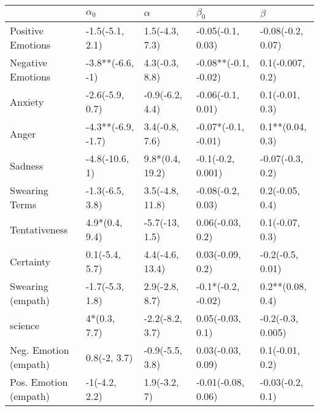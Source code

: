 \begin{tabular}{lllll}
\toprule
{} &          $\alpha_0$ &         $\alpha$ &             $\beta_0$ &            $\beta$ \\
\midrule
Positive Emotions     &     -1.5(-5.1, 2.1) &   1.5(-4.3, 7.3) &     -0.05(-0.1, 0.03) &  -0.08(-0.2, 0.07) \\
Negative Emotions     &    -3.8**(-6.6, -1) &   4.3(-0.3, 8.8) &  -0.08**(-0.1, -0.02) &   0.1(-0.007, 0.2) \\
Anxiety               &     -2.6(-5.9, 0.7) &  -0.9(-6.2, 4.4) &     -0.06(-0.1, 0.01) &    0.1(-0.01, 0.3) \\
Anger                 &  -4.3**(-6.9, -1.7) &   3.4(-0.8, 7.6) &   -0.07*(-0.1, -0.01) &   0.1**(0.04, 0.3) \\
Sadness               &      -4.8(-10.6, 1) &  9.8*(0.4, 19.2) &     -0.1(-0.2, 0.001) &   -0.07(-0.3, 0.2) \\
Swearing Terms        &     -1.3(-6.5, 3.8) &  3.5(-4.8, 11.8) &     -0.08(-0.2, 0.03) &    0.2(-0.05, 0.4) \\
Tentativeness         &      4.9*(0.4, 9.4) &   -5.7(-13, 1.5) &      0.06(-0.03, 0.2) &    0.1(-0.07, 0.3) \\
Certainty             &      0.1(-5.4, 5.7) &  4.4(-4.6, 13.4) &      0.03(-0.09, 0.2) &   -0.2(-0.5, 0.01) \\
Swearing (empath)     &     -1.7(-5.3, 1.8) &   2.9(-2.8, 8.7) &    -0.1*(-0.2, -0.02) &   0.2**(0.08, 0.4) \\
science               &        4*(0.3, 7.7) &  -2.2(-8.2, 3.7) &      0.05(-0.03, 0.1) &  -0.2(-0.3, 0.005) \\
Neg. Emotion (empath) &        0.8(-2, 3.7) &  -0.9(-5.5, 3.8) &     0.03(-0.03, 0.09) &    0.1(-0.01, 0.2) \\
Pos. Emotion (empath) &       -1(-4.2, 2.2) &     1.9(-3.2, 7) &    -0.01(-0.08, 0.06) &   -0.03(-0.2, 0.1) \\
\bottomrule
\end{tabular}

